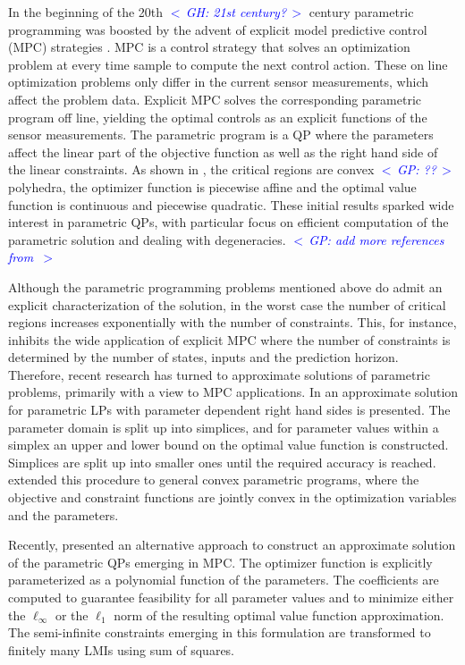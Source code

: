 \documentclass{article}
\newcommand{\commentGP}[1]{\noindent \textcolor{blue}{\emph{$<\,$GP: #1$\,>$}}}%
\newcommand{\commentGH}[1]{\noindent \textcolor{blue}{\emph{$<\,$GH: #1$\,>$}}}%
\begin{document}
In the beginning of the 20th \commentGH{21st century?} century parametric programming was boosted by the advent of explicit model predictive control (MPC) strategies \cite{Alessio2009}. MPC is a control strategy that solves an optimization problem at every time sample to compute the next control action. These on line optimization problems only differ in the current sensor measurements, which affect the problem data. Explicit MPC solves the corresponding parametric program off line, yielding the optimal controls as an explicit functions of the sensor measurements. The parametric program is a QP where the parameters affect the linear part of the objective function as well as the right hand side of the linear constraints. As shown in \cite{Bemporad_et_al_2002}, the critical regions
are convex \commentGP{??} polyhedra, the optimizer function is piecewise affine and the optimal value function is continuous and piecewise quadratic. These initial results sparked wide interest in parametric QPs, with particular focus on efficient computation of the parametric solution and dealing with degeneracies. \commentGP{add more references from \cite{Alessio2009}}

Although the parametric programming problems mentioned above do admit an explicit characterization of the solution, in the worst case the number of critical regions increases exponentially with the number of constraints. This, for instance, inhibits the wide application of explicit MPC where the number of constraints is determined by the number of states, inputs and the prediction horizon. Therefore, recent research has turned to approximate solutions of parametric problems, primarily with a view to MPC applications. In \cite{Filippi_2004} an approximate solution for parametric LPs with parameter dependent right hand sides is presented. The parameter domain is split up into simplices, and for parameter values within a simplex an upper and lower bound on the optimal value function is constructed. Simplices are split up into smaller ones until the required accuracy is reached. \cite{Bemporad_et_al_2002} extended this procedure to general convex parametric programs, where the objective and constraint functions are jointly convex in the optimization variables and the parameters.

Recently, \cite{Oishi2013} presented an alternative approach to construct an approximate solution of the parametric QPs emerging in MPC. The optimizer function is explicitly parameterized as a polynomial function of the parameters. The coefficients are computed to guarantee feasibility for all parameter values and to minimize either the $\ell_\infty$ or the $\ell_1$ norm of the resulting optimal value function approximation. The semi-infinite constraints emerging in this formulation are transformed to finitely many LMIs using sum of squares.
\end{document}
